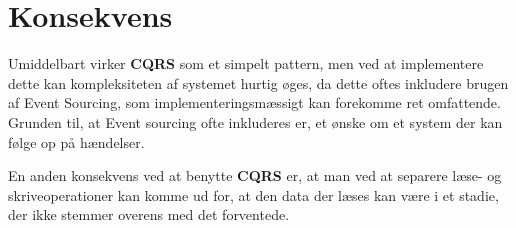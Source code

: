 \section{Konsekvens}
Umiddelbart virker \textbf{CQRS} som et simpelt pattern, men ved at implementere dette kan kompleksiteten af systemet hurtig øges, da dette oftes inkludere brugen af Event Sourcing, som implementeringsmæssigt kan forekomme ret omfattende. Grunden til, at Event sourcing ofte inkluderes er, et ønske om et system der kan følge op på hændelser. 

En anden konsekvens ved at benytte \textbf{CQRS} er, at man ved at separere læse- og skriveoperationer kan komme ud for, at den data der læses kan være i et stadie, der ikke stemmer overens med det forventede.

